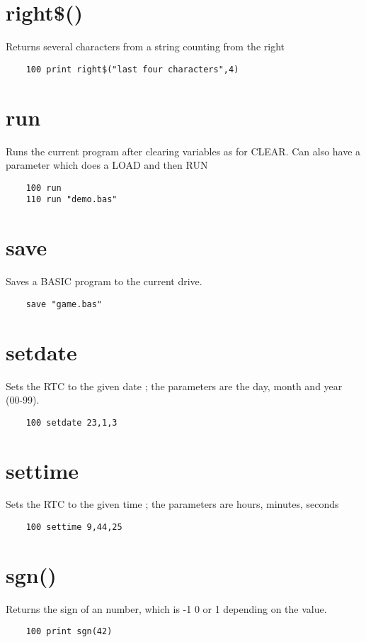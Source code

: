\section*{right\$()}
Returns several characters from a string counting from the right
\example{}
\begin{verbatim}
	100 print right$("last four characters",4)
\end{verbatim}

\section*{run}
Runs the current program after clearing variables as for CLEAR. Can also have a parameter which does a LOAD and then RUN
\example{}
\begin{verbatim}
	100 run
	110 run "demo.bas"
\end{verbatim}

\section*{save}
Saves a BASIC program to the current drive.
\example{}
\begin{verbatim}
	save "game.bas"
\end{verbatim}

\section*{setdate}
Sets the RTC to the given date ; the parameters are the day, month and year (00-99). 
\example{}
\begin{verbatim}
	100 setdate 23,1,3
\end{verbatim}

\section*{settime}
Sets the RTC to the given time ; the parameters are hours, minutes, seconds
\example{}
\begin{verbatim}
	100 settime 9,44,25
\end{verbatim}

\section*{sgn()}
Returns the sign of an number, which is -1 0 or 1 depending on the value.
\example{}
\begin{verbatim}
	100 print sgn(42)
\end{verbatim}

